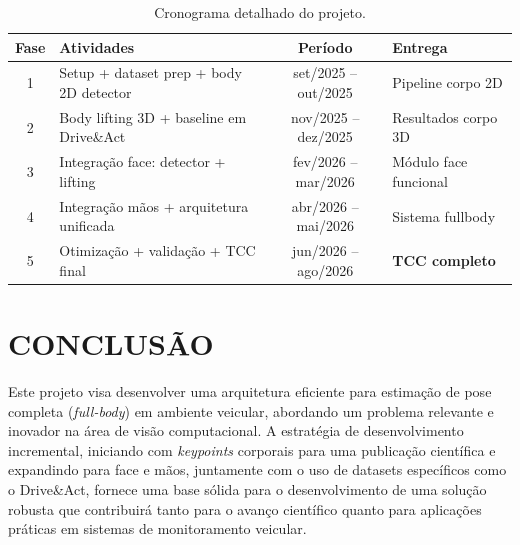 \documentclass[12pt, a4paper]{article}
\begin{document}
\begin{table}[!ht]

    \centering

        \caption{Cronograma detalhado do projeto.}

        \label{tab:cronograma}

        \begin{tabular}{|c|p{6cm}|c|p{2.5cm}|}

            \hline

            \textbf{Fase} & \textbf{Atividades}                      & \textbf{Período} & \textbf{Entrega}              \\ \hline

            1             & Setup + dataset prep + body 2D detector  & set/2025 -- out/2025          & Pipeline corpo 2D             \\ \hline

            2             & Body lifting 3D + baseline em Drive\&Act & nov/2025 -- dez/2025          & Resultados corpo 3D           \\ \hline

            3             & Integração face: detector + lifting      & fev/2026 -- mar/2026          & Módulo face funcional         \\ \hline

            4             & Integração mãos + arquitetura unificada  & abr/2026 -- mai/2026          & Sistema fullbody              \\ \hline

            5             & Otimização + validação + TCC final       & jun/2026 -- ago/2026        & \textbf{TCC completo}         \\ \hline

        \end{tabular}

\end{table}

\section{CONCLUSÃO}
Este projeto visa desenvolver uma arquitetura eficiente para estimação de pose
completa (\textit{full-body}) em ambiente veicular, abordando um problema
relevante e inovador na área de visão computacional. A estratégia de
desenvolvimento incremental, iniciando com \textit{keypoints} corporais para
uma publicação científica e expandindo para face e mãos, juntamente com o uso
de datasets específicos como o Drive\&Act, fornece uma base sólida para o
desenvolvimento de uma solução robusta que contribuirá tanto para o avanço
científico quanto para aplicações práticas em sistemas de monitoramento
veicular.
\end{document}
